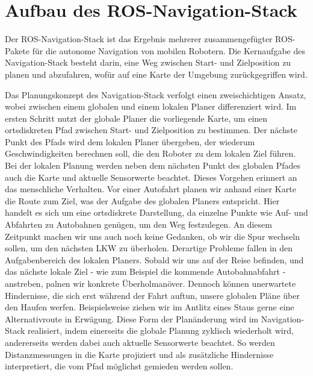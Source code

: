 \section*{Aufbau des ROS-Navigation-Stack}
Der ROS-Navigation-Stack ist das Ergebnis mehrerer zusammengefügter ROS-Pakete für die autonome Navigation von mobilen Robotern. Die Kernaufgabe des Navigation-Stack besteht darin, eine Weg zwischen Start- und Zielposition zu planen und abzufahren, wofür auf eine Karte der Umgebung zurückgegriffen wird.

Das Planungskonzept des Navigation-Stack verfolgt einen zweischichtigen Ansatz, wobei zwischen einem globalen und einem lokalen Planer differenziert wird. Im ersten Schritt nutzt der globale Planer die vorliegende Karte, um einen ortsdiskreten Pfad zwischen Start- und Zielposition zu bestimmen. Der nächste Punkt des Pfads wird dem lokalen Planer übergeben, der wiederum Geschwindigkeiten berechnen soll, die den Roboter zu dem lokalen Ziel führen. Bei der lokalen Planung werden neben dem nächsten Punkt des globalen Pfades auch die Karte und aktuelle Sensorwerte beachtet. Dieses Vorgehen erinnert an das menschliche Verhalten. Vor einer Autofahrt planen wir anhand einer Karte die Route zum Ziel, was der Aufgabe des globalen Planers entspricht. Hier handelt es sich um eine ortsdiskrete Darstellung, da einzelne Punkte wie Auf- und Abfahrten zu Autobahnen genügen, um den Weg festzulegen. An diesem Zeitpunkt machen wir uns auch noch keine Gedanken, ob wir die Spur wechseln sollen, um den nächsten LKW zu überholen. Derartige Probleme fallen in den Aufgabenbereich des lokalen Planers. Sobald wir uns auf der Reise befinden, und das nächste lokale Ziel - wie zum Beispiel die kommende Autobahnabfahrt - anstreben, palnen wir konkrete Überholmanöver. Dennoch können unerwartete Hindernisse, die sich erst während der Fahrt auftun, unsere globalen Pläne über den Haufen werfen. Beispielsweise ziehen wir im Antlitz eines Staus gerne eine Alternativroute in Erwägung. Diese Form der Planänderung wird im Navigation-Stack realisiert, indem einerseits die globale Planung zyklisch wiederholt wird, andererseits werden dabei auch aktuelle Sensorwerte beachtet. So werden Distanzmessungen in die Karte projiziert und als zusätzliche Hindernisse interpretiert, die vom Pfad möglichst gemieden werden sollen.

